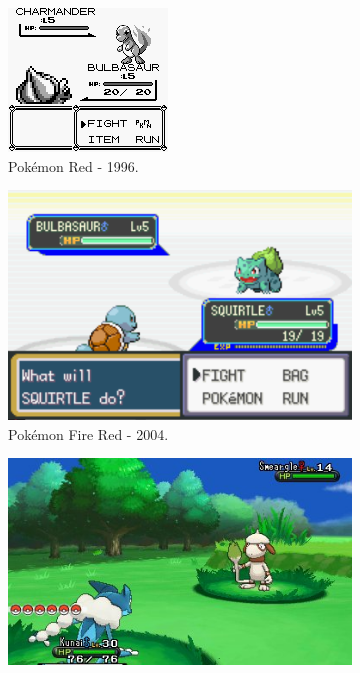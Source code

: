 \begin{figure}[h!]
  \centering
  \begin{subfigure}[b]{0.3\linewidth}
    \includegraphics[width=\linewidth]{redb.jpg}
     \caption{Pokémon Red - 1996.}
  \end{subfigure}
  \begin{subfigure}[b]{0.4\linewidth}
    \includegraphics[width=\linewidth]{fireredb.jpg}
    \caption{Pokémon Fire Red - 2004.}
  \end{subfigure}
  \begin{subfigure}[b]{0.6\linewidth}
    \includegraphics[width=\linewidth]{xyb.jpg}

\end{subfigure}
\end{figure}
